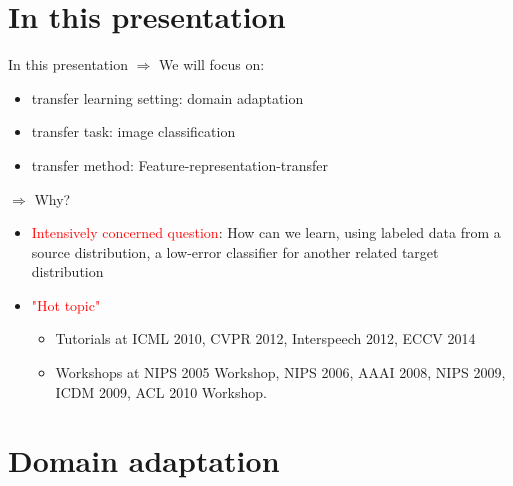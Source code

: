 \documentclass{beamer}
\begin{document}
\section{In this presentation}
\begin{frame}{In this presentation}
$\Rightarrow$  We will focus on:
\begin{itemize}
\item transfer learning setting: domain adaptation
\item  transfer task: image classification 
\item  transfer method: Feature-representation-transfer
\end{itemize}

$\Rightarrow$ Why?
\begin{itemize}
\item \textcolor{red}{Intensively concerned question}:  How can we learn, using labeled data from a source distribution, a low-error classifier for another related target distribution
\item \textcolor{red}{"Hot topic"}
\begin{itemize}
\item Tutorials at ICML 2010, CVPR 2012, Interspeech 2012, ECCV 2014
\item Workshops at NIPS 2005 Workshop, NIPS 2006, AAAI 2008, NIPS 2009, ICDM 2009, ACL 2010 Workshop.


\end{itemize}

\end{itemize}
\end{frame}
\section{Domain adaptation}
\end{document}
